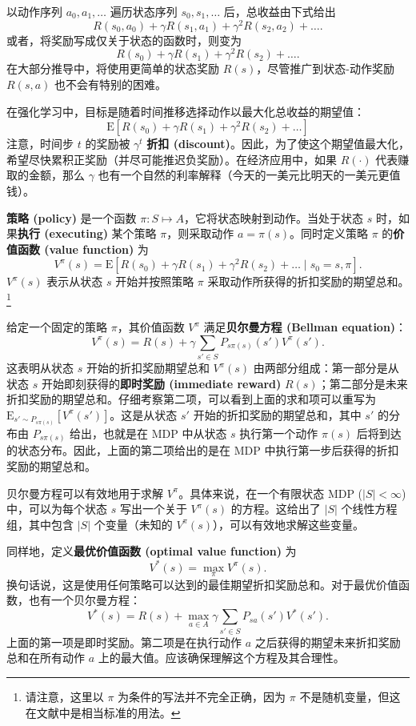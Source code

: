 以动作序列 $a_0, a_1, \dots$ 遍历状态序列 $s_0, s_1, \dots$ 后，总收益由下式给出
\[
    R(s_0, a_0) + \gamma R(s_1, a_1) + \gamma^2 R(s_2, a_2) + \dots.
\]
或者，将奖励写成仅关于状态的函数时，则变为
\[
    R(s_0) + \gamma R(s_1) + \gamma^2 R(s_2) + \dots.
\]
在大部分推导中，将使用更简单的状态奖励 $R(s)$，尽管推广到状态-动作奖励 $R(s, a)$ 也不会有特别的困难。

在强化学习中，目标是随着时间推移选择动作以最大化总收益的期望值：
\[
    \text{E}\left[R(s_0) + \gamma R(s_1) + \gamma^2 R(s_2) + \dots\right]
\]
注意，时间步 $t$ 的奖励被 $\gamma^t$ \textbf{折扣 (discount)}。因此，为了使这个期望值最大化，希望尽快累积正奖励（并尽可能推迟负奖励）。在经济应用中，如果 $R(\cdot)$ 代表赚取的金额，那么 $\gamma$ 也有一个自然的利率解释（今天的一美元比明天的一美元更值钱）。

\textbf{策略 (policy)} 是一个函数 $\pi: S \mapsto A$，它将状态映射到动作。当处于状态 $s$ 时，如果\textbf{执行 (executing)} 某个策略 $\pi$，则采取动作 $a = \pi(s)$。同时定义策略 $\pi$ 的\textbf{价值函数 (value function)} 为
\[
    V^\pi(s) = \text{E}\left[R(s_0) + \gamma R(s_1) + \gamma^2 R(s_2) + \dots \mid s_0 = s, \pi\right].
\]
$V^\pi(s)$ 表示从状态 $s$ 开始并按照策略 $\pi$ 采取动作所获得的折扣奖励的期望总和。\footnote{请注意，这里以 $\pi$ 为条件的写法并不完全正确，因为 $\pi$ 不是随机变量，但这在文献中是相当标准的用法。}

给定一个固定的策略 $\pi$，其价值函数 $V^\pi$ 满足\textbf{贝尔曼方程 (Bellman equation)}：
\[
    V^\pi(s) = R(s) + \gamma \sum_{s' \in S} P_{s\pi(s)}(s') V^\pi(s').
\]
这表明从状态 $s$ 开始的折扣奖励期望总和 $V^\pi(s)$ 由两部分组成：第一部分是从状态 $s$ 开始即刻获得的\textbf{即时奖励 (immediate reward)} $R(s)$；第二部分是未来折扣奖励的期望总和。仔细考察第二项，可以看到上面的求和项可以重写为 $\text{E}_{s' \sim P_{s\pi(s)}}[V^\pi(s')]$。这是从状态 $s'$ 开始的折扣奖励的期望总和，其中 $s'$ 的分布由 $P_{s\pi(s)}$ 给出，也就是在 MDP 中从状态 $s$ 执行第一个动作 $\pi(s)$ 后将到达的状态分布。因此，上面的第二项给出的是在 MDP 中执行第一步后获得的折扣奖励的期望总和。

贝尔曼方程可以有效地用于求解 $V^\pi$。具体来说，在一个有限状态 MDP ($|S| < \infty$) 中，可以为每个状态 $s$ 写出一个关于 $V^\pi(s)$ 的方程。这给出了 $|S|$ 个线性方程组，其中包含 $|S|$ 个变量（未知的 $V^\pi(s)$），可以有效地求解这些变量。

同样地，定义\textbf{最优价值函数 (optimal value function)} 为
\begin{equation}
    V^*(s) = \max_{\pi} V^\pi(s).
    \label{eq:15.1}
\end{equation}
换句话说，这是使用任何策略可以达到的最佳期望折扣奖励总和。对于最优价值函数，也有一个贝尔曼方程：
\begin{equation}
    V^*(s) = R(s) + \max_{a \in A} \gamma \sum_{s' \in S} P_{sa}(s') V^*(s').
    \label{eq:15.2}
\end{equation}
上面的第一项是即时奖励。第二项是在执行动作 $a$ 之后获得的期望未来折扣奖励总和在所有动作 $a$ 上的最大值。应该确保理解这个方程及其合理性。

